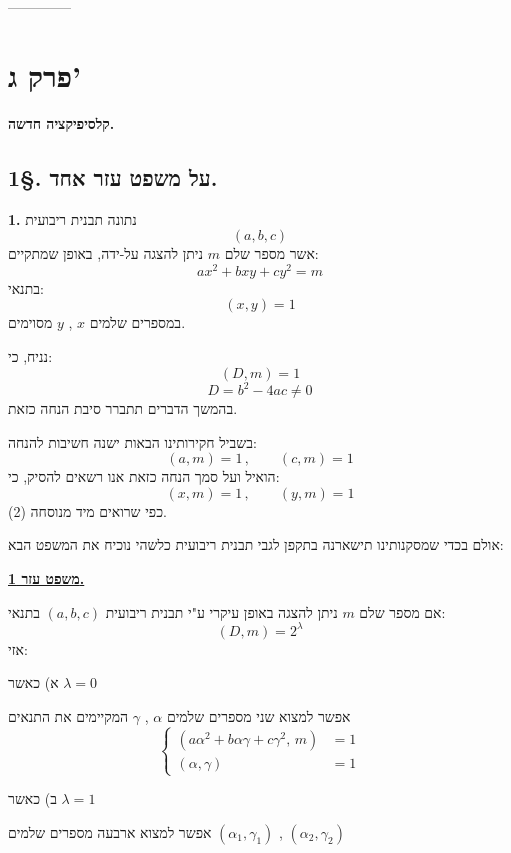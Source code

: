 \bigskip
\begin{center}
--------------
\end{center}

\section*{פרק ג'}

\begin{center}
\textbf{קלסיפיקציה חדשה.}
\end{center}

\subsection*{1\S. על משפט עזר אחד.}

\noindent\textbf{1.} נתונה תבנית ריבועית
\[ (a,b,c) \tag{1} \]
\noindent אשר מספר שלם $m$ ניתן להצגה על-ידה, באופן שמתקיים:
\[ ax^2 + bxy + cy^2 = m \tag{2} \]
\noindent בתנאי:
\[ (x,y) = 1 \tag{3} \]
\noindent במספרים שלמים $x$ , $y$ מסוימים.

\noindent נניח, כי:
\[ (D,m) = 1 \tag{4} \]
\[ D = b^2 - 4ac \neq 0 \]
\noindent בהמשך הדברים תתברר סיבת הנחה כזאת.

\noindent בשביל חקירותינו הבאות ישנה חשיבות להנחה:
\[ (a,m) = 1 \, , \qquad (c,m) = 1 \tag{5} \]
\noindent הואיל ועל סמך הנחה כזאת אנו רשאים להסיק, כי:
\[ (x,m) = 1 \, , \qquad (y,m) = 1 \tag{6} \]
\noindent כפי שרואים מיד מנוסחה (2).

\noindent אולם בכדי שמסקנותינו תישארנה בתקפן לגבי תבנית ריבועית כלשהי נוכיח את המשפט הבא:

\bigskip
\noindent\textbf{\underline{משפט עזר 1.}}

\noindent אם מספר שלם $m$ ניתן להצגה באופן עיקרי ע"י תבנית ריבועית $(a,b,c)$ בתנאי:
\[ (D,m) = 2^{\lambda} \tag{7} \]
\noindent אזי:

\noindent א) כאשר $\lambda = 0$

\noindent אפשר למצוא שני מספרים שלמים $\alpha$ , $\gamma$ המקיימים את התנאים
\[ \left\{ \begin{aligned} (a\alpha^2+b\alpha\gamma+c\gamma^2,\, m) &= 1 \\ (\alpha,\gamma) &= 1 \end{aligned} \right. \tag{8} \]

\noindent ב) כאשר $\lambda = 1$

\noindent אפשר למצוא ארבעה מספרים שלמים $(\alpha_1,\gamma_1)$ , $(\alpha_2,\gamma_2)$

